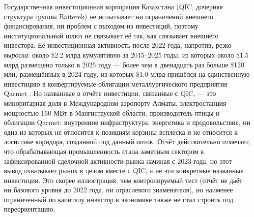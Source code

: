 \documentclass[12pt]{article}
\begin{document}
Государственная инвестиционная корпорация Казахстана (QIC, дочерняя структура группы
Baiterek) не испытывает ни ограничений внешнего финансирования, ни проблем с выходом из
инвестиций, поэтому институциональный шлюз не связывает её так, как связывает внешнего
инвестора. Её инвестиционная активность после 2022 года, напротив, резко \emph{выросла}:
около \$2.2 млрд кумулятивно за 2015--2025 годы, из которых около \$1.5 млрд размещено
только в 2025 году — более чем в двенадцать раз больше \$120 млн, размещённых в 2024 году,
из которых \$1.0 млрд пришёлся на единственную инвестицию в конвертируемые облигации
металлургического предприятия Qarmet \citep{qicaifcifc2026pe}. Но названные в отчёте
инвестиции, связанные с QIC, — это миноритарная доля в Международном аэропорту Алматы,
электростанция мощностью 160 МВт в Мангистауской области, производитель птицы и облигации
Qarmet: внутренние инфраструктура, энергетика и продовольствие, ни одна из которых не
относится к позициям корзины всплеска и не относится к логистике коридора, созданной под
данный поток. Отчёт действительно отмечает, что обрабатывающая промышленность стала заметным
сектором в зафиксированной сделочной активности рынка начиная с 2023 года, но этот вывод
охватывает рынок в целом вместе с QIC, а не эти конкретные названные инвестиции. Это скорее
иллюстрация, чем контролируемый тест (отчёт не даёт ни базового уровня до 2022 года, ни
отраслевого знаменателя), но наименее ограниченный по капиталу инвестор в экономике также не
стал строить под переориентацию.
\end{document}
